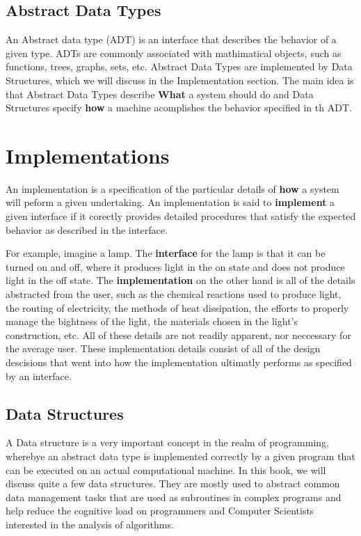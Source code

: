 \documentclass[12pt, letterpaper]{book}
\begin{document}
	\subsection{Abstract Data Types}

		An Abstract data type (ADT) is an interface that describes the behavior of a given type. ADTs are commonly associated with mathimatical objects, such as functions, trees, graphs, sets, etc. Abstract Data Types are implemented by Data Structures, which we will discuss in the Implementation section. The main idea is that Abstract Data Types describe \textbf{What} a system should do and Data Structures specify \textbf{how} a machine acomplishes the behavior specified in th ADT.

	\section{Implementations}

	An implementation is a specification of the particular details of \textbf{how} a system will peform a given undertaking. An implementation is said to \textbf{implement} a given interface if it corectly provides detailed procedures that satisfy the expected behavior as described in the interface. 

For example, imagine a lamp. The \textbf{interface} for the lamp is that it can be turned on and off, where it produces light in the on state and does not produce light in the off state. The \textbf{implementation} on the other hand is all of the details abstracted from the user, such as the chemical reactions used to produce light, the routing of electricity, the methods of heat dissipation, the efforts to properly manage the bightness of the light, the materials chosen in the light's construction, etc. All of these details are not readily apparent, nor neccessary for the average user. These implementation details consist of all of the design descisions that went into how the implementation ultimatly performs as specified by an interface.

	\subsection{Data Structures}

	A Data structure is a very important concept in the realm of programming, wherebye an abstract data type is implemented correctly by a given program that can be executed on an actual computational machine. In this book, we will discuss quite a few data structures. They are mostly used to abstract common data management tasks that are used as subroutines in complex programs and help reduce the cognitive load on programmers and Computer Scientists interested in the analysis of algorithms.
\end{document}
